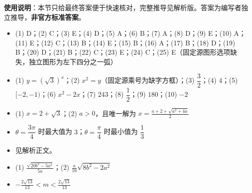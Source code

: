 
\begin{gknotice}
\textbf{使用说明}：本节只给最终答案便于快速核对，完整推导见解析版。答案为编写者独立推导，\textbf{非官方标准答案}。
\end{gknotice}

\begin{itemize}[leftmargin=2.6em]
  \item[\textbf{1.}] (1) D；(2) C；(3) E；(4) D；(5) A；(6) B；(7) A；(8) D；(9) E；(10) A；(11) E；(12) C；(13) B；(14) E；(15) B；(16) A；(17) B；(18) D；(19) B；(20) D；(21) B；(22) C；(23) E；(24) C；(25) E（固定源图形选项缺失，独立图形为左下四分之一弧）
  \item[\textbf{2.}] (1) $y=(\sqrt3)^x$；(2) $x^2=y$（固定源乘号为缺字方框）；(3) $\dfrac32$；(4) $4$；(5) $[-2,-1)$；(6) $x^2-2x$；(7) $243$；(8) $\dfrac12$；(9) $180$；(10) $-2$
  \item[\textbf{3.}] (1) $x=2+\sqrt3$；(2) $a>0$，且唯一解为 $\displaystyle x=\frac{a+2+\sqrt{a^2+4a}}2$
  \item[\textbf{4.}] $\theta=\dfrac{3\pi}4$ 时最大值为 $3$；$\theta=\dfrac\pi4$ 时最小值为 $\dfrac13$
  \item[\textbf{5.}] 见解析正文。
  \item[\textbf{6.}] (1) $\displaystyle \frac{\sqrt{20b^2-5a^2}}{5a}$；(2) $\displaystyle \frac a{16}\sqrt{8b^2-2a^2}$
  \item[\textbf{7.}] $\displaystyle -\frac{2\sqrt{13}}{13}<m<\frac{2\sqrt{13}}{13}$
\end{itemize}
